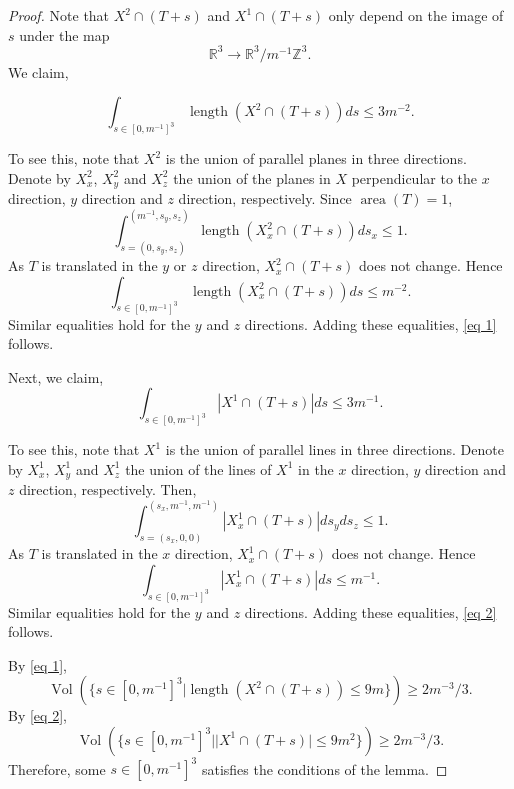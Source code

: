 \documentclass[10pt,a4paper]{amsart}
\DeclareMathOperator*{\Area}{area}
\DeclareMathOperator*{\Vol}{Vol}
\DeclareMathOperator*{\length}{length}
\begin{document}
\begin{proof} Note that $X^2\cap (T+s)$ and $X^1\cap (T+s)$ only depend on the image of $s$ under the map $$\mathbb{R}^3\to \mathbb{R}^3/m^{-1}\mathbb{Z}^3.$$ We claim, 

\begin{equation}\label{eq 1}\int_{s\in [0,m^{-1}]^3}\length(X^2\cap (T+s))ds\leq 3m^{-2}.
\end{equation}

To see this, note that $X^2$ is the union of parallel planes in three directions. Denote by $X^2_x$, $X^2_y$ and $X^2_z$ the union of the planes in $X$ perpendicular to the $x$ direction, $y$ direction and $z$ direction, respectively. Since $\Area(T)=1$, 
$$\int_{s=(0,s_y,s_z)}^{(m^{-1},s_y,s_z)}\length{(X^2_x\cap (T+s))}ds_x\leq 1.
$$ As $T$ is translated in the $y$ or $z$ direction, $X^2_x\cap (T+s)$ does not change. Hence $$\int_{s\in[0,m^{-1}]^3}\length(X^2_x\cap (T+s))ds\leq m^{-2}.$$ Similar equalities hold for the $y$ and $z$ directions. Adding these equalities, \cref{eq 1} follows. 

Next, we claim, \begin{equation}\label{eq 2}\int_{s\in [0,m^{-1}]^3}|X^1\cap (T+s)|ds\leq 3m^{-1}.
\end{equation}

To see this, note that $X^1$ is the union of parallel lines in three directions. Denote by $X^1_x$, $X^1_y$ and $X^1_z$ the union of the lines of $X^1$ in the $x$ direction, $y$ direction and $z$ direction, respectively. Then, $$\int_{s=(s_x,0,0)}^{(s_x,m^{-1},m^{-1})} |X^1_x\cap (T+s)|ds_yds_z\leq 1.$$ As $T$ is translated in the $x$ direction, $X^1_x\cap (T+s)$ does not change. Hence $$\int_{s\in[0,m^{-1}]^3}|X^1_x\cap (T+s)|ds\leq m^{-1}.$$ Similar equalities hold for the $y$ and $z$ directions. Adding these equalities, \cref{eq 2} follows. 

By \cref{eq 1}, $$\Vol(\{s\in [0,m^{-1}]^3|\length(X^2\cap (T+s))\leq 9m\})\geq 2m^{-3}/3.$$ By \cref{eq 2}, $$\Vol(\{s\in [0,m^{-1}]^3||X^1\cap (T+s)|\leq 9m^2\})\geq 2m^{-3}/3.$$ Therefore, some $s\in [0,m^{-1}]^3$ satisfies the conditions of the lemma. 
\end{proof}
\end{document}
